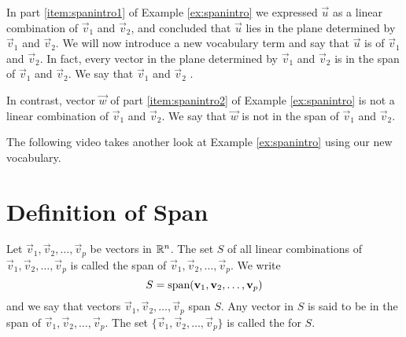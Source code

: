 \documentclass{ximera}
\begin{document}
\begin{example}
\begin{explanation}
\begin{image}
\end{image}
  
  \end{explanation}
\end{example}

In part \ref{item:spanintro1} of Example \ref{ex:spanintro} we expressed $\vec{u}$ as a linear combination of $\vec{v}_1$ and $\vec{v}_2$, and concluded that $\vec{u}$ lies in the plane determined by $\vec{v}_1$ and $\vec{v}_2$.  We will now introduce a new vocabulary term and say that $\vec{u}$ is  of $\vec{v}_1$ and $\vec{v}_2$.  In fact, every vector in the plane determined by $\vec{v}_1$ and $\vec{v}_2$ is in the span of $\vec{v}_1$ and $\vec{v}_2$.  We say that $\vec{v}_1$ and $\vec{v}_2$ .

In contrast, vector $\vec{w}$ of part \ref{item:spanintro2} of Example \ref{ex:spanintro} is not a linear combination of $\vec{v}_1$ and $\vec{v}_2$.  We say that $\vec{w}$ is not in the span of $\vec{v}_1$ and $\vec{v}_2$.

The following video takes another look at Example \ref{ex:spanintro} using our new vocabulary.


\section*{Definition of Span}

\begin{definition}\label{def:span} Let $\vec{v}_1, \vec{v}_2,\ldots ,\vec{v}_p$ be vectors in $\RR^n$.  The set $S$ of all linear combinations of $\vec{v}_1, \vec{v}_2,\ldots ,\vec{v}_p$ is called the span of $\vec{v}_1, \vec{v}_2,\ldots ,\vec{v}_p$.  We write 
$$S=\textnormal{span}(\vec{v}_1, \vec{v}_2,\ldots ,\vec{v}_p)$$
and we say that vectors $\vec{v}_1, \vec{v}_2,\ldots ,\vec{v}_p$ span $S$.  Any vector in $S$ is said to be in the span of $\vec{v}_1, \vec{v}_2,\ldots ,\vec{v}_p$.  The set $\{\vec{v}_1, \vec{v}_2,\ldots ,\vec{v}_p\}$ is called the  for $S$.
\end{definition}
\end{document}
